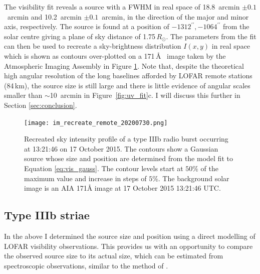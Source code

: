 The visibility fit reveals a source with a FWHM in real space of 18.8~arcmin $\pm 0.1$~arcmin and 10.2~arcmin $\pm 0.1$~arcmin, in the direction of the major and minor axis, respectively. The source is found at a position of $-1312^{\prime\prime}, -1064^{\prime\prime}$ from the solar centre giving a plane of sky distance of 1.75$\, R_\odot$. The parameters from the fit can then be used to recreate a sky-brightness distribution $I(x,y)$ in real space which is shown as contours over-plotted on a 171\,\AA~ image taken by the Atmospheric Imaging Assembly \citep[AIA;][]{Lemen2012} in Figure \ref{fig:recreate}. Note that, despite the theoretical high angular resolution of the long baselines afforded by LOFAR remote stations (84\,km), the source size is still large and there is little evidence of angular scales smaller than $\sim$10~arcmin in Figure~\ref{fig:uv_fit}c. I will discuss this further in Section \ref{sec:conclusion}.

\begin{figure}
    \centering
    \texttt{[image: im\_recreate\_remote\_20200730.png]}
    \caption[Recreated sky intensity profile of a type IIIb radio burst.]{Recreated sky intensity profile of a type IIIb radio burst occurring at 13:21:46 on 17 October 2015. The contours show a Gaussian source whose size and position are determined from the model fit to Equation \ref{eq:vis_gauss}. The contour levels start at $50\%$ of the maximum value and increase in steps of $5\%$.  The background solar image is an AIA 171{\AA} image at 17 October 2015 13:21:46 UTC.} 
    \label{fig:recreate}
\end{figure}


\subsection{Type IIIb striae}
In the above I determined the source size and position using a direct modelling of LOFAR visibility observations. This provides us with an opportunity to compare the observed source size to its actual size, which can be estimated from spectroscopic observations, similar to the method of \cite{Kontar2017}.

